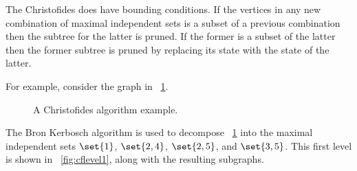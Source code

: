 The Christofides does have bounding conditions.  If the vertices in any new combination of maximal independent sets
is a subset of a previous combination then the subtree for the latter is pruned.  If the former is a subset of the
latter then the former subtree is pruned by replacing its state with the state of the latter.

For example, consider the graph in \figurename~\ref{fig:cfexample}.

\begin{figure}[H]
  \centering
  \caption{A Christofides algorithm example.}
  \label{fig:cfexample}
\end{figure}

The Bron Kerbosch algorithm is used to decompose \figurename~\ref{fig:cfexample} into the maximal independent sets
\(\set{1}\), \(\set{2,4}\), \(\set{2,5}\), and \(\set{3,5}\).  This first level is shown in
\figurename~\ref{fig:cflevel1}, along with the resulting subgraphs.

